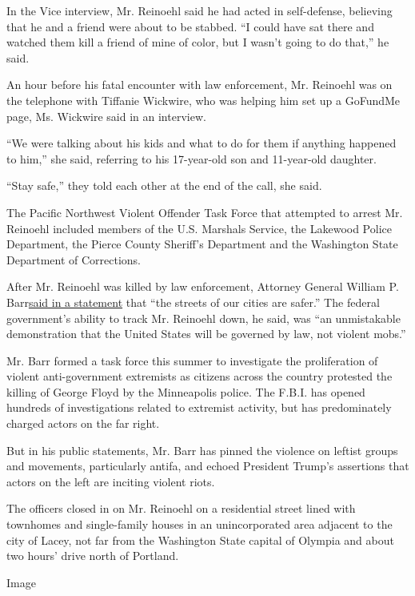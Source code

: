 In the Vice interview, Mr. Reinoehl said he had acted in self-defense,
believing that he and a friend were about to be stabbed. ``I could have
sat there and watched them kill a friend of mine of color, but I wasn't
going to do that,'' he said.

An hour before his fatal encounter with law enforcement, Mr. Reinoehl
was on the telephone with Tiffanie Wickwire, who was helping him set up
a GoFundMe page, Ms. Wickwire said in an interview.

``We were talking about his kids and what to do for them if anything
happened to him,'' she said, referring to his 17-year-old son and
11-year-old daughter.

``Stay safe,'' they told each other at the end of the call, she said.

The Pacific Northwest Violent Offender Task Force that attempted to
arrest Mr. Reinoehl included members of the U.S. Marshals Service, the
Lakewood Police Department, the Pierce County Sheriff's Department and
the Washington State Department of Corrections.

After Mr. Reinoehl was killed by law enforcement, Attorney General
William P.
Barr\href{https://www.justice.gov/opa/pr/statement-attorney-general-william-p-barr-tracking-down-fugitive-michael-forest-reinoehl}{said
in a statement} that ``the streets of our cities are safer.'' The
federal government's ability to track Mr. Reinoehl down, he said, was
``an unmistakable demonstration that the United States will be governed
by law, not violent mobs.''

Mr. Barr formed a task force this summer to investigate the
proliferation of violent anti-government extremists as citizens across
the country protested the killing of George Floyd by the Minneapolis
police. The F.B.I. has opened hundreds of investigations related to
extremist activity, but has predominately charged actors on the far
right.

But in his public statements, Mr. Barr has pinned the violence on
leftist groups and movements, particularly antifa, and echoed President
Trump's assertions that actors on the left are inciting violent riots.

The officers closed in on Mr. Reinoehl on a residential street lined
with townhomes and single-family houses in an unincorporated area
adjacent to the city of Lacey, not far from the Washington State capital
of Olympia and about two hours' drive north of Portland.

Image

